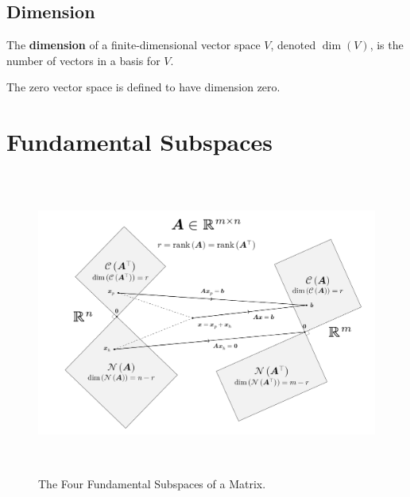 \documentclass{article}
\begin{document}
\subsection{Dimension}
\begin{definition}
    The \textbf{dimension} of a finite-dimensional vector space \(V\),
    denoted \(\dim{\left( V \right)}\), is the number of vectors in a
    basis for \(V\).
\end{definition}
\begin{theorem}
    The zero vector space is defined to have dimension zero.
\end{theorem}
\newpage
\section{Fundamental Subspaces}
\begin{figure}[H]
    \centering
    \includegraphics[height=10cm, keepaspectratio]{figures/fundamental_subspaces}
    \caption{The Four Fundamental Subspaces of a Matrix.}
\end{figure}
\end{document}
